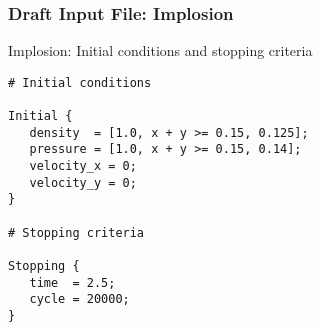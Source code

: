 \begin{frame}[fragile] \frametitle{Draft Input File: Implosion}
 \footnotesize
\begin{block}{Implosion: Initial conditions and stopping criteria}
\begin{verbatim}
# Initial conditions

Initial {
   density  = [1.0, x + y >= 0.15, 0.125];
   pressure = [1.0, x + y >= 0.15, 0.14];
   velocity_x = 0;
   velocity_y = 0;
}

# Stopping criteria

Stopping {
   time  = 2.5;
   cycle = 20000;
}
\end{verbatim}
\end{block}
\end{frame}
